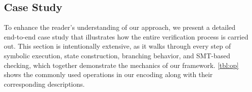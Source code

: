 \subsection{Case Study}
\label{sec:case-study}
To enhance the reader’s understanding of our approach, we present a detailed end-to-end case study that illustrates how the entire verification process is carried out. This section is intentionally extensive, as it walks through every step of symbolic execution, state construction, branching behavior, and SMT-based checking, which together demonstrate the mechanics of our framework. \autoref{tbl:op} shows the commonly used operations in our encoding along with their corresponding descriptions. 

